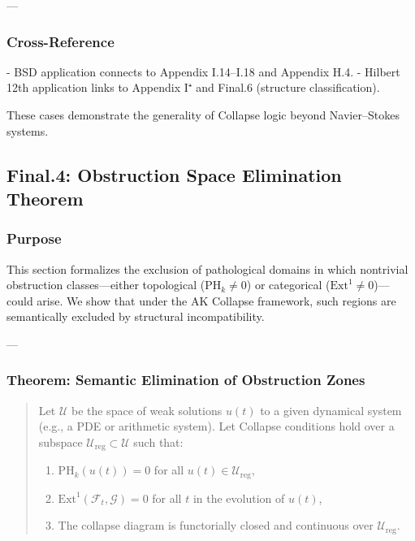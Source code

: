 \documentclass[11pt]{article}
\begin{document}
\begin{axiom}
\begin{axiom}
{{---

\subsubsection*{Cross-Reference}

- BSD application connects to Appendix I.14–I.18 and Appendix H.4.
- Hilbert 12th application links to Appendix I⁺ and Final.6 (structure classification).

These cases demonstrate the generality of Collapse logic beyond Navier–Stokes systems.



\subsection*{Final.4: Obstruction Space Elimination Theorem}

\subsubsection*{Purpose}

This section formalizes the exclusion of pathological domains in which  
nontrivial obstruction classes—either topological (\(\mathrm{PH}_k \neq 0\))  
or categorical (\(\mathrm{Ext}^1 \neq 0\))—could arise.  
We show that under the AK Collapse framework, such regions are  
semantically excluded by structural incompatibility.

---

\subsubsection*{Theorem: Semantic Elimination of Obstruction Zones}

\begin{quote}
Let \( \mathcal{U} \) be the space of weak solutions \( u(t) \)  
to a given dynamical system (e.g., a PDE or arithmetic system).  
Let Collapse conditions hold over a subspace \( \mathcal{U}_{\text{reg}} \subset \mathcal{U} \)  
such that:

\begin{enumerate}
  \item \( \mathrm{PH}_k(u(t)) = 0 \) for all \( u(t) \in \mathcal{U}_{\text{reg}} \),
  \item \( \mathrm{Ext}^1(\mathcal{F}_t, \mathcal{G}) = 0 \) for all \( t \) in the evolution of \( u(t) \),
  \item The collapse diagram is functorially closed and continuous over \( \mathcal{U}_{\text{reg}} \).
\end{enumerate}


\end{quote}}}
\end{axiom}
\end{axiom}
\end{document}
